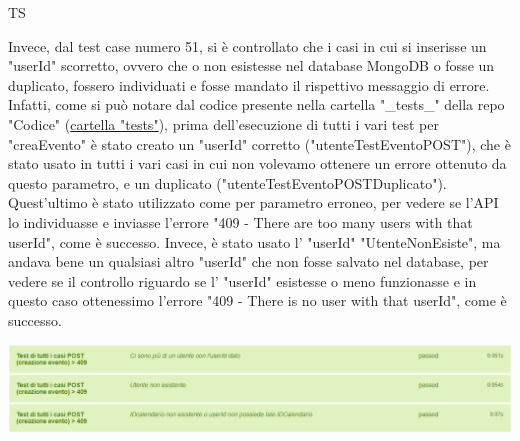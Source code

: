 \begin{listaPersonale}{TS}
\begin{center}
                \end{center}
                Invece, dal test case numero 51, si è controllato che i casi in cui si inserisse un "userId" scorretto, ovvero che o non esistesse nel database MongoDB o fosse un duplicato, fossero individuati e fosse mandato il rispettivo messaggio di errore. Infatti, come si può notare dal codice presente nella cartella "\_tests\_" della repo "Codice" (\href{https://github.com/Life-planner/Codice/tree/main/__tests__}{cartella "tests"}), prima dell'esecuzione di tutti i vari test per "creaEvento" è stato creato un "userId" corretto ("utenteTestEventoPOST"), che è stato usato in tutti i vari casi in cui non volevamo ottenere un errore ottenuto da questo parametro, e un duplicato ("utenteTestEventoPOSTDuplicato"). Quest'ultimo è stato utilizzato come per parametro erroneo, per vedere se l'API lo individuasse e inviasse l'errore "409 - There are too many users with that userId", come è successo. Invece, è stato usato l' "userId" "UtenteNonEsiste", ma andava bene un qualsiasi altro "userId" che non fosse salvato nel database, per vedere se il controllo riguardo se l' "userId" esistesse o meno funzionasse e in questo caso ottenessimo l'errore "409 - There is no user with that userId", come è successo.
                \begin{center}
                        \includegraphics[width=1\textwidth, height=0.12\textheight]{img/png/tests/EventoPost/409_PostEvento.png}
                \end{center}

\end{listaPersonale}
